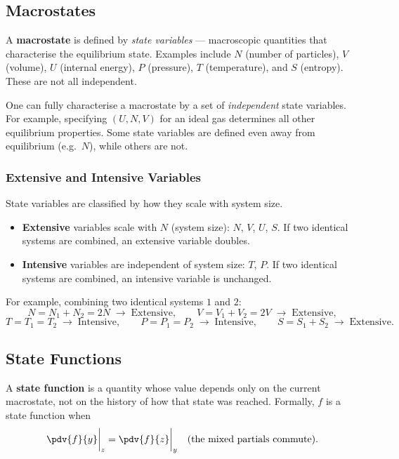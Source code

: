 \subsection{Macrostates}

\begin{definition}
A \textbf{macrostate} is defined by \emph{state variables} --- macroscopic quantities that
characterise the equilibrium state. Examples include $N$ (number of particles), $V$ (volume),
$U$ (internal energy), $P$ (pressure), $T$ (temperature), and $S$ (entropy). These are not
all independent.
\end{definition}

One can fully characterise a macrostate by a set of \emph{independent} state variables. For
example, specifying $(U, N, V)$ for an ideal gas determines all other equilibrium properties.
Some state variables are defined even away from equilibrium (e.g.\ $N$), while others are not.

\subsubsection*{Extensive and Intensive Variables}

State variables are classified by how they scale with system size.
\begin{itemize}
  \item \textbf{Extensive} variables scale with $N$ (system size): $N$, $V$, $U$, $S$. If two
        identical systems are combined, an extensive variable doubles.
  \item \textbf{Intensive} variables are independent of system size: $T$, $P$. If two identical
        systems are combined, an intensive variable is unchanged.
\end{itemize}

For example, combining two identical systems $\boxed{1}$ and $\boxed{2}$:
\[
  N = N_1 + N_2 = 2N \;\to\; \text{Extensive}, \qquad
  V = V_1 + V_2 = 2V \;\to\; \text{Extensive},
\]
\[
  T = T_1 = T_2 \;\to\; \text{Intensive}, \qquad
  P = P_1 = P_2 \;\to\; \text{Intensive}, \qquad
  S = S_1 + S_2 \;\to\; \text{Extensive}.
\]

\subsection{State Functions}

\begin{definition}
A \textbf{state function} is a quantity whose value depends only on the current macrostate, not
on the history of how that state was reached. Formally, $f$ is a state function when
\[
  \pdv{f}{y}\bigg|_z = \pdv{f}{z}\bigg|_y \quad (\text{the mixed partials commute}).
\]
\end{definition}

